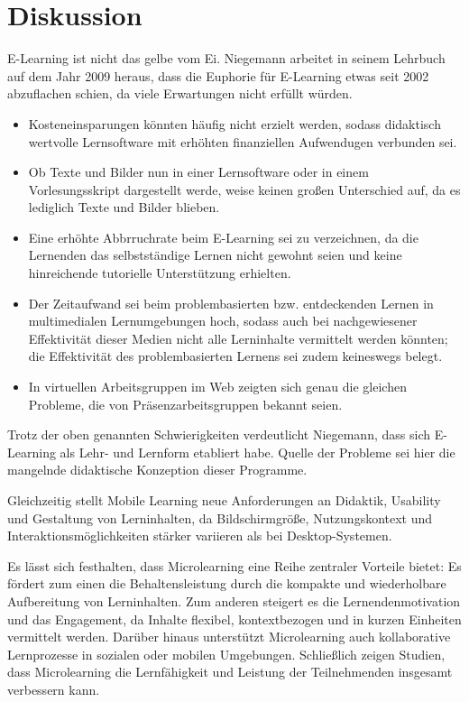 \section{Diskussion}

E-Learning ist nicht das gelbe vom Ei\label{elearning}. Niegemann arbeitet in seinem Lehrbuch auf dem Jahr 2009 heraus, dass die Euphorie für E-Learning etwas seit 2002 abzuflachen schien, da viele Erwartungen nicht erfüllt würden.\parencite[S.~14]{niegemann_kompendium_2008}

\begin{itemize}
	\item Kosteneinsparungen könnten häufig nicht erzielt werden, sodass didaktisch wertvolle Lernsoftware mit erhöhten finanziellen Aufwendugen verbunden sei.
	\item Ob Texte und Bilder nun in einer Lernsoftware oder in einem Vorlesungsskript dargestellt werde, weise keinen großen Unterschied auf, da es lediglich Texte und Bilder blieben.
	\item Eine erhöhte Abbrruchrate beim E-Learning sei zu verzeichnen, da die Lernenden das selbstständige Lernen nicht gewohnt seien und keine hinreichende tutorielle Unterstützung erhielten.
	\item Der Zeitaufwand sei beim problembasierten bzw. entdeckenden Lernen in multimedialen Lernumgebungen hoch, sodass auch bei nachgewiesener Effektivität dieser Medien nicht alle Lerninhalte vermittelt werden könnten; die Effektivität des problembasierten Lernens sei zudem keineswegs belegt.
	\item In virtuellen Arbeitsgruppen im Web zeigten sich genau die gleichen Probleme, die von Präsenzarbeitsgruppen bekannt seien.
\end{itemize}

Trotz der oben genannten Schwierigkeiten verdeutlicht Niegemann, dass sich E-Learning als Lehr- und Lernform etabliert habe. Quelle der Probleme sei hier die mangelnde didaktische Konzeption dieser Programme.\parencite[S.~14]{niegemann_kompendium_2008}

Gleichzeitig stellt Mobile Learning neue Anforderungen an Didaktik, Usability und Gestaltung von Lerninhalten, da Bildschirmgröße, Nutzungskontext und Interaktionsmöglichkeiten stärker variieren als bei Desktop-Systemen.

Es lässt sich festhalten, dass Microlearning eine Reihe zentraler Vorteile bietet: Es fördert zum einen die Behaltensleistung durch die kompakte und wiederholbare Aufbereitung von Lerninhalten. Zum anderen steigert es die Lernendenmotivation und das Engagement, da Inhalte flexibel, kontextbezogen und in kurzen Einheiten vermittelt werden. Darüber hinaus unterstützt Microlearning auch kollaborative Lernprozesse in sozialen oder mobilen Umgebungen. Schließlich zeigen Studien, dass Microlearning die Lernfähigkeit und Leistung der Teilnehmenden insgesamt verbessern kann.\parencite[S.~2]{leong_review_2021}
